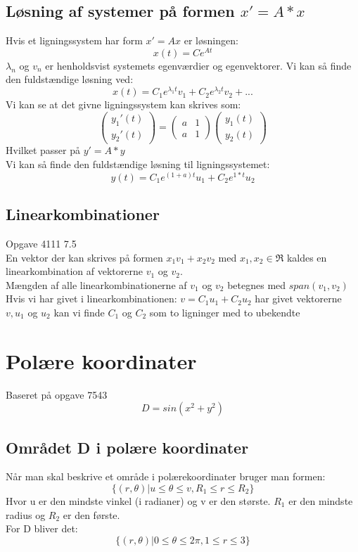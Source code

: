 \documentclass{article}
\begin{document}
\subsection{Løsning af systemer på formen $x'=A*x$}
Hvis et ligningssystem har form $x'=Ax$ er løsningen:
$$x(t)=Ce^{At}$$
$\lambda_n$ og $v_n$ er henholdsvist systemets egenværdier og egenvektorer. Vi 
kan så finde den fuldstændige løsning ved:
$$x(t)=C_1e^{\lambda_1t}v_1+C_2e^{\lambda_2t}v_2+...$$
Vi kan se at det givne ligningssystem kan skrives som:
$$\begin{pmatrix}
y_1'(t)\\
y_2'(t)
\end{pmatrix}=
\begin{pmatrix}
a & 1\\
a & 1
\end{pmatrix}\begin{pmatrix}
y_1(t)\\
y_2(t)
\end{pmatrix}$$
Hvilket passer på $y'=A*y$\\
Vi kan så finde den fuldstændige løsning til ligningssystemet:
$$y(t)=C_1e^{(1+a)t}u_1+C_2e^{1*t}u_2$$

\subsection{Linearkombinationer}
{\tiny Opgave 4111 7.5}\\
En vektor der kan skrives på formen $x_1v_1+x_2v_2$ med $x_1,x_2\in\Re$ kaldes 
en linearkombination af vektorerne $v_1$ og $v_2$.\\
Mængden af alle linearkombinationerne af $v_1$ og $v_2$ betegnes med 
$span(v_1,v_2)$
Hvis vi har givet i linearkombinationen: $v=C_1u_1+C_2u_2$ har givet vektorerne 
$v, u_1$ og $u_2$ kan vi finde $C_1$ og $C_2$ som to ligninger med to ubekendte

\newpage

\section{Polære koordinater}
{\tiny Baseret på opgave 7543}
$$D=sin(x^2+y^2)$$
\subsection{Området D i polære koordinater}
Når man skal beskrive et område i polærekoordinater bruger man formen:
$$\{(r,\theta)|u\leq\theta\leq v, R_1\leq r\leq R_2 \}$$
Hvor u er den mindste vinkel (i radianer) og v er den største. $R_1$ er den 
mindste radius og $R_2$ er den første.\\
For D bliver det:
$$\{(r,\theta)|0\leq\theta\leq 2\pi, 1\leq r\leq 3 \}$$
\end{document}
